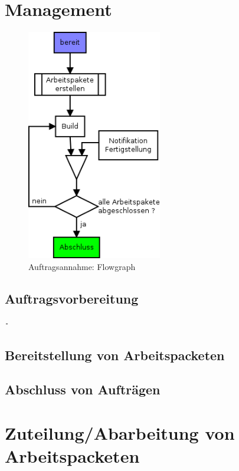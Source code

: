 \section{Management}

\begin{figure}[ht] 
  \label{fig:lebenszyklus-auftrag-abarbeitung}
  \begin{center}
      \includegraphics[height=4in]{imageinput/lebenszyklus-auftrag-abarbeitung.png}
  \end{center}
  \caption{Auftragsannahme: Flowgraph}
\end{figure}

\subsection{Auftragsvorbereitung}

\begin{verbatim}
- 
\end{verbatim}


\subsection{Bereitstellung von Arbeitspacketen}
\subsection{Abschluss von Auftr\"agen}


\section{Zuteilung/Abarbeitung von Arbeitspacketen}


